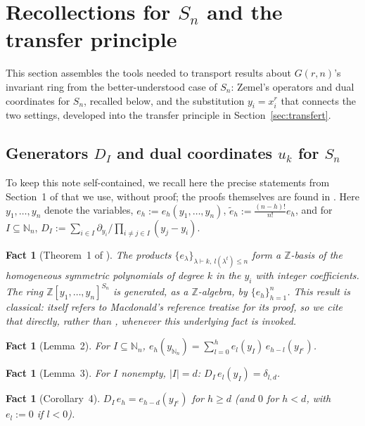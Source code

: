 \documentclass[10pt,a4paper]{amsart}
\newtheorem{fact}[theorem]{Fact}
\newcommand{\NN}{\mathbb{N}}
\newcommand{\ZZ}{\mathbb{Z}}
\begin{document}
\section{Recollections for $S_n$ and the transfer principle}

This section assembles the tools needed to transport results about $G(r,n)$'s invariant ring from the better-understood case of $S_n$: Zemel's operators and dual coordinates for $S_n$, recalled below, and the substitution $y_i=x_i^r$ that connects the two settings, developed into the transfer principle in Section~\ref{sec:transfert}.

\subsection{Generators $D_I$ and dual coordinates $u_k$ for $S_n$}\label{sec:rappels}

To keep this note self-contained, we recall here the precise statements from Section~1 of \cite{Ze} that we use, without proof; the proofs themselves are found in \cite{Ze}. Here $y_1,\dots,y_n$ denote the variables, $e_h:=e_h(y_1,\dots,y_n)$, $\tilde e_h:=\frac{(n-h)!}{n!}e_h$, and for $I\subseteq\NN_n$, $D_I:=\sum_{i\in I}\partial_{y_i}/\prod_{i\ne j\in I}(y_j-y_i)$.

\begin{fact}[Theorem~1 of \cite{Ze}]\label{fact:A}
The products $\{e_\lambda\}_{\lambda\vdash k,\ l(\lambda^t)\le n}$ form a $\ZZ$-basis of the homogeneous symmetric polynomials of degree $k$ in the $y_i$ with integer coefficients. The ring $\ZZ[y_1,\dots,y_n]^{S_n}$ is generated, as a $\ZZ$-algebra, by $\{e_h\}_{h=1}^n$. This result is classical: \cite{Ze} itself refers to Macdonald's reference treatise \cite[Ch.~I]{Mac} for its proof, so we cite that directly, rather than \cite{Ze}, whenever this underlying fact is invoked.
\end{fact}

\begin{fact}[Lemma~2]\label{fact:B}
For $I\subseteq\NN_n$, $e_h(y_{\NN_n}) = \sum_{l=0}^h e_l(y_I)\,e_{h-l}(y_{I^c})$.
\end{fact}

\begin{fact}[Lemma~3]\label{fact:C}
For $I$ nonempty, $|I|=d$: $D_I\,e_l(y_I) = \delta_{l,d}$.
\end{fact}

\begin{fact}[Corollary~4]\label{fact:D}
$D_I\,e_h = e_{h-d}(y_{I^c})$ for $h\ge d$ (and $0$ for $h<d$, with $e_l:=0$ if $l<0$).
\end{fact}
\end{document}
